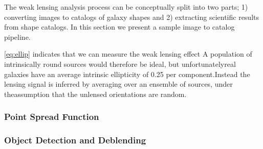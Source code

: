 The weak lensing analysis process can be conceptually split into two parts; 1) converting images to catalogs of galaxy shapes and 2) extracting scientific results from shape catalogs. In this section we present a sample image to catalog pipeline. 

\par \autoref{eq:ellip} indicates that we can measure the weak lensing effect A population of intrinsically round sources would therefore be ideal, but unfortunatelyreal  galaxies  have  an  average  intrinsic  ellipticity  of 0.25  per  component.Instead the lensing signal is inferred by averaging over an ensemble of sources, under theassumption that the unlensed orientations are random.


\subsubsection{Point Spread Function}

\subsubsection{Object Detection and Deblending}




